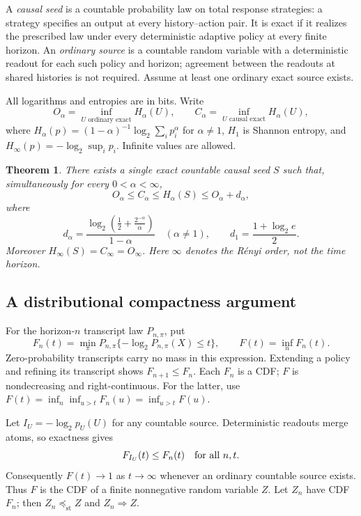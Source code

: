 \documentclass[11pt,a4paper]{article}
\newtheorem{theorem}{Theorem}[section]
\theoremstyle{definition}\newtheorem{definition}[theorem]{Definition}
\theoremstyle{remark}\newtheorem{remark}[theorem]{Remark}
\newcommand{\st}{\preceq_{\mathrm{st}}}
\numberwithin{equation}{section}
\begin{document}
A \emph{causal seed} is a countable probability law on total response
strategies: a strategy specifies an output at every history--action pair.
It is exact if it realizes the prescribed law under every deterministic
adaptive policy at every finite horizon. An \emph{ordinary source} is a
countable random variable with a deterministic readout for each such
policy and horizon; agreement between the readouts at shared histories is
not required. Assume at least one ordinary exact source exists.

All logarithms and entropies are in bits. Write
\[
 O_\alpha=\inf_{U\text{ ordinary exact}}H_\alpha(U),\qquad
 C_\alpha=\inf_{U\text{ causal exact}}H_\alpha(U),
\]
where $H_\alpha(p)=(1-\alpha)^{-1}\log_2\sum_i p_i^\alpha$ for
$\alpha\ne1$, $H_1$ is Shannon entropy, and
$H_\infty(p)=-\log_2\sup_i p_i$. Infinite values are allowed.

\begin{theorem}\label{ren:thm:main}
There exists a single exact countable causal seed $S$ such that, simultaneously
for every $0<\alpha<\infty$,
\[
 \boxed{O_\alpha\le C_\alpha\le H_\alpha(S)\le O_\alpha+d_\alpha,}
\]
where
\[
 d_\alpha=\frac{\log_2\!\left(\frac12+\frac{2^{-\alpha}}{\alpha}\right)}
 {1-\alpha}\quad(\alpha\ne1),\qquad
 d_1=\frac{1+\log_2 e}{2}.
\]
Moreover $H_\infty(S)=C_\infty=O_\infty$.
Here $\infty$ denotes the R\'enyi order, not the time horizon.
\end{theorem}

\subsection{A distributional compactness argument}
For the horizon-$n$ transcript law $P_{n,\pi}$, put
\[
 F_n(t)=\min_\pi P_{n,\pi}\{-\log_2P_{n,\pi}(X)\le t\},
 \qquad F(t)=\inf_nF_n(t).
\]
Zero-probability transcripts carry no mass in this expression.
Extending a policy and refining its transcript shows $F_{n+1}\le F_n$.
Each $F_n$ is a CDF; $F$ is nondecreasing and right-continuous. For the latter,
use $F(t)=\inf_n\inf_{u>t}F_n(u)=\inf_{u>t}F(u)$.

Let $I_U=-\log_2 p_U(U)$ for any countable source.
Deterministic readouts merge atoms, so exactness gives
\begin{equation}\label{ren:eq:lower}
 F_{I_U}(t)\le F_n(t)\quad\hbox{for all }n,t.
\end{equation}
Consequently $F(t)\to1$ as $t\to\infty$ whenever an ordinary countable source
exists. Thus $F$ is the CDF of a finite nonnegative random variable $Z$.
Let $Z_n$ have CDF $F_n$; then $Z_n\st Z$ and $Z_n\Rightarrow Z$.
\end{document}
